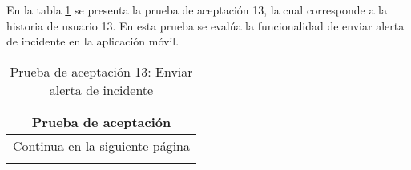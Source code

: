 En la tabla \ref{tab:prueba-13} se presenta la prueba de aceptación 13, la cual corresponde a la historia de usuario 13.
En esta prueba se evalúa la funcionalidad de enviar alerta de incidente en la aplicación móvil.

\begin{longtable}{|p{6.7cm}|p{6.7cm}|}
    \caption{Prueba de aceptación 13: Enviar alerta de incidente} \label{tab:prueba-13}
    \\
    \hline
    \multicolumn{2}{|c|}{\textbf{Prueba de aceptación}}                                                                                                                                                                                                    \\
    \hline

    \endfirsthead

    \hline
    \endhead

    \hline
    \multicolumn{2}{|c|}{{Continua en la siguiente página}}                                                                                                                                                                                                \\
    \hline
    \endfoot


\end{longtable}
